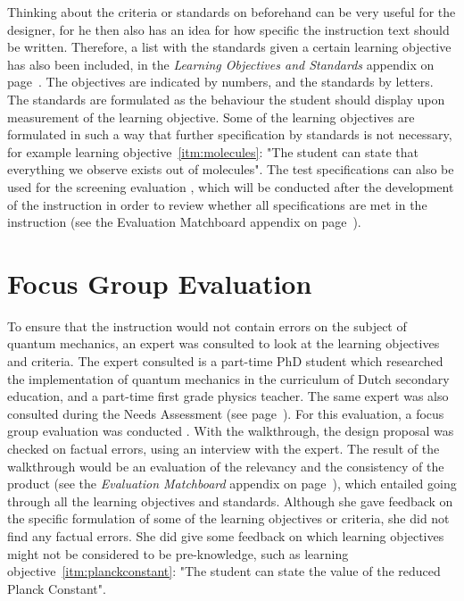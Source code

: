 \documentclass[11pt,twoside]{report} %
\begin{document}
Thinking about the criteria or standards on beforehand can be very useful for the designer, for he then also has an idea for how specific the instruction text should be written. Therefore, a list with the standards given a certain learning objective has also been included, in the \emph{Learning Objectives and Standards} appendix on page~\pageref{app:objectivestandards}. The objectives are indicated by numbers, and the standards by letters. The standards are formulated as the behaviour the student should display upon measurement of the learning objective. Some of the learning objectives are formulated in such a way that further specification by standards is not necessary, for example learning objective~\ref{itm:molecules}: "The student can state that everything we observe exists out of molecules". The test specifications can also be used for the screening evaluation \cite{evamatchboard}, which will be conducted after the development of the instruction in order to review whether all specifications are met in the instruction (see the Evaluation Matchboard appendix on page~\pageref{app:evamatchboard}).

\chapter{Focus Group Evaluation}
\label{ch:focusgroup}

To ensure that the instruction would not contain errors on the subject of quantum mechanics, an expert was consulted to look at the learning objectives and criteria. The expert consulted is a part-time PhD student which researched the implementation of quantum mechanics in the curriculum of Dutch secondary education, and a part-time first grade physics teacher. The same expert was also consulted during the Needs Assessment (see page~\pageref{ssch:problem}). For this evaluation, a focus group evaluation was conducted \cite{evamatchboard}. With the walkthrough, the design proposal was checked on factual errors, using an interview with the expert. The result of the walkthrough would be an evaluation of the relevancy and the consistency of the product (see the \emph{Evaluation Matchboard} appendix on page~\pageref{app:evamatchboard}), which entailed going through all the learning objectives and standards. Although she gave  feedback on the specific formulation of some of the learning objectives or criteria, she did not find any factual errors. She did give some feedback on which learning objectives might not be considered to be pre-knowledge, such as learning objective~\ref{itm:planckconstant}: "The student can state the value of the reduced Planck Constant".
\end{document}
